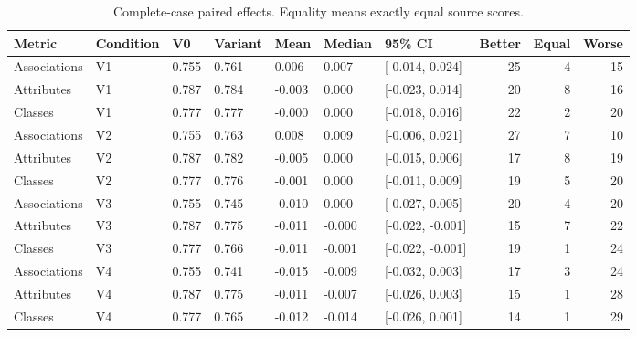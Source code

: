 \begin{table}

\caption{Complete-case paired effects. Equality means exactly equal source scores.}
\centering
\begin{tabular}[t]{lllllllrrr}
\toprule
Metric & Condition & V0 & Variant & Mean & Median & 95\% CI & Better & Equal & Worse\\
\midrule
Associations & V1 & 0.755 & 0.761 & 0.006 & 0.007 & {}[-0.014, 0.024] & 25 & 4 & 15\\
Attributes & V1 & 0.787 & 0.784 & -0.003 & 0.000 & {}[-0.023, 0.014] & 20 & 8 & 16\\
Classes & V1 & 0.777 & 0.777 & -0.000 & 0.000 & {}[-0.018, 0.016] & 22 & 2 & 20\\
Associations & V2 & 0.755 & 0.763 & 0.008 & 0.009 & {}[-0.006, 0.021] & 27 & 7 & 10\\
Attributes & V2 & 0.787 & 0.782 & -0.005 & 0.000 & {}[-0.015, 0.006] & 17 & 8 & 19\\
\addlinespace
Classes & V2 & 0.777 & 0.776 & -0.001 & 0.000 & {}[-0.011, 0.009] & 19 & 5 & 20\\
Associations & V3 & 0.755 & 0.745 & -0.010 & 0.000 & {}[-0.027, 0.005] & 20 & 4 & 20\\
Attributes & V3 & 0.787 & 0.775 & -0.011 & -0.000 & {}[-0.022, -0.001] & 15 & 7 & 22\\
Classes & V3 & 0.777 & 0.766 & -0.011 & -0.001 & {}[-0.022, -0.001] & 19 & 1 & 24\\
Associations & V4 & 0.755 & 0.741 & -0.015 & -0.009 & {}[-0.032, 0.003] & 17 & 3 & 24\\
\addlinespace
Attributes & V4 & 0.787 & 0.775 & -0.011 & -0.007 & {}[-0.026, 0.003] & 15 & 1 & 28\\
Classes & V4 & 0.777 & 0.765 & -0.012 & -0.014 & {}[-0.026, 0.001] & 14 & 1 & 29\\
\bottomrule
\end{tabular}
\end{table}
